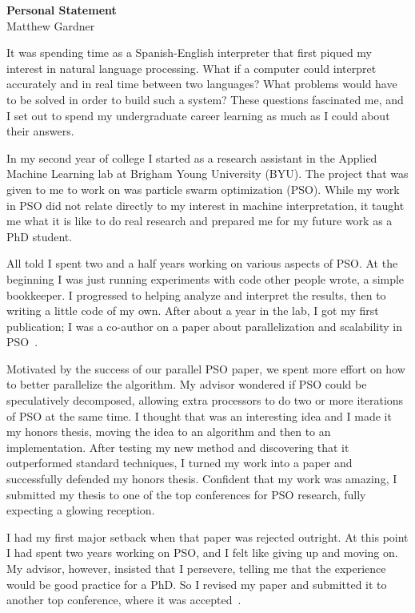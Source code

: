 \documentclass[onecolumn, 12pt]{article}
\begin{document}
\pagestyle{empty}

\begin{center}
  \textbf{Personal Statement}\\
  Matthew Gardner
\end{center}

It was spending time as a Spanish-English interpreter that first piqued my
interest in natural language processing.  What if a computer could interpret
accurately and in real time between two languages?  What problems would have to
be solved in order to build such a system?  These questions fascinated me, and
I set out to spend my undergraduate career learning as much as I could about
their answers.

In my second year of college I started as a research assistant in the Applied
Machine Learning lab at Brigham Young University (BYU).  The project that was
given to me to work on was particle swarm optimization (PSO).  While my work in
PSO did not relate directly to my interest in machine interpretation, it taught
me what it is like to do real research and prepared me for my future work as a
PhD student.

All told I spent two and a half years working on various aspects of PSO.  At
the beginning I was just running experiments with code other people wrote, a
simple bookkeeper.  I progressed to helping analyze and interpret the results,
then to writing a little code of my own.  After about a year in the lab, I got
my first publication; I was a co-author on a paper about parallelization and
scalability in PSO~\cite{mcnabb-2009-large-particle-swarms}.  

Motivated by the success of our parallel PSO paper, we spent more effort on how
to better parallelize the algorithm.  My advisor wondered if PSO could be
speculatively decomposed, allowing extra processors to do two or more
iterations of PSO at the same time.  I thought that was an interesting idea and
I made it my honors thesis, moving the idea to an algorithm and then to an
implementation.  After testing my new method and discovering that it
outperformed standard techniques, I turned my work into a paper and
successfully defended my honors thesis.  Confident that my work was amazing, I
submitted my thesis to one of the top conferences for PSO research, fully
expecting a glowing reception.

I had my first major setback when that paper was rejected outright.  At this
point I had spent two years working on PSO, and I felt like giving up and
moving on.  My advisor, however, insisted that I persevere, telling me that the
experience would be good practice for a PhD.  So I revised my paper and
submitted it to another top conference, where it was
accepted~\cite{gardner-2010-speculative-evaluation-in-pso}.
\end{document}
